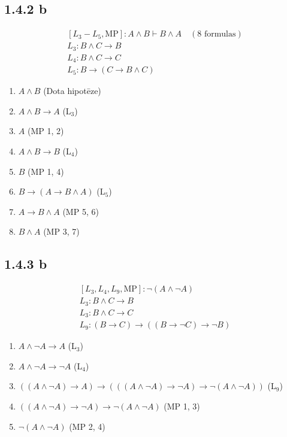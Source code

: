 \documentclass{article}
\begin{document}
\subsection*{1.4.2 b}

\[
    \begin{array}{l}
        [L_3 - L_5, \text{MP}]: A \land B \vdash B \land A \quad (8 \text{ formulas}) \\
        L_3: B \land C \rightarrow B                                                  \\
        L_4: B \land C \rightarrow C                                                  \\
        L_5: B \rightarrow (C \rightarrow B \land C)
    \end{array}
\]

\begin{enumerate}
    \item $A \land B$ \hfill (Dota hipotēze)
    \item $A \land B \rightarrow A$ \hfill (L$_3$)
    \item $A$ \hfill (MP 1, 2)
    \item $A \land B \rightarrow B$ \hfill (L$_4$)
    \item $B$ \hfill (MP 1, 4)
    \item $B \rightarrow (A \rightarrow B \land A)$ \hfill (L$_5$)
    \item $A \rightarrow B \land A$ \hfill (MP 5, 6)
    \item $B \land A$ \hfill (MP 3, 7)
\end{enumerate}

\subsection*{1.4.3 b}

\[
    \begin{array}{l}
        [L_3, L_4, L_9, \text{MP}]: \neg( A \land \neg A) \\
        L_3: B \land C \rightarrow B                      \\
        L_3: B \land C \rightarrow C                      \\
        L_9: (B \rightarrow C) \rightarrow ((B \rightarrow \neg C) \rightarrow \neg B)
    \end{array}
\]

\begin{enumerate}
    \item $A \land \neg A \rightarrow A$ \hfill (L$_3$)
    \item $A \land \neg A \rightarrow \neg A$ \hfill (L$_4$)
    \item $((A \land \neg A) \rightarrow A) \rightarrow (((A \land \neg A) \rightarrow \neg A) \rightarrow \neg(A \land \neg A))$ \hfill (L$_9$)
    \item $((A \land \neg A) \rightarrow \neg A) \rightarrow \neg(A \land \neg A)$ \hfill (MP 1, 3)
    \item $\neg(A \land \neg A)$ \hfill (MP 2, 4)
\end{enumerate}
\end{document}
